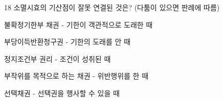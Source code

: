 \begin{question}{18}
소멸시효의 기산점이 잘못 연결된 것은? (다툼이 있으면 판례에 따름)
\begin{choices}
  \item 불확정기한부 채권 - 기한이 객관적으로 도래한 때
  \item 부당이득반환청구권 - 기한의 도래를 안 때
  \item 정지조건부 권리 - 조건이 성취된 때
  \item 부작위를 목적으로 하는 채권 - 위반행위를 한 때
  \item 선택채권 - 선택권을 행사할 수 있을 때
\end{choices}
\end{question}
